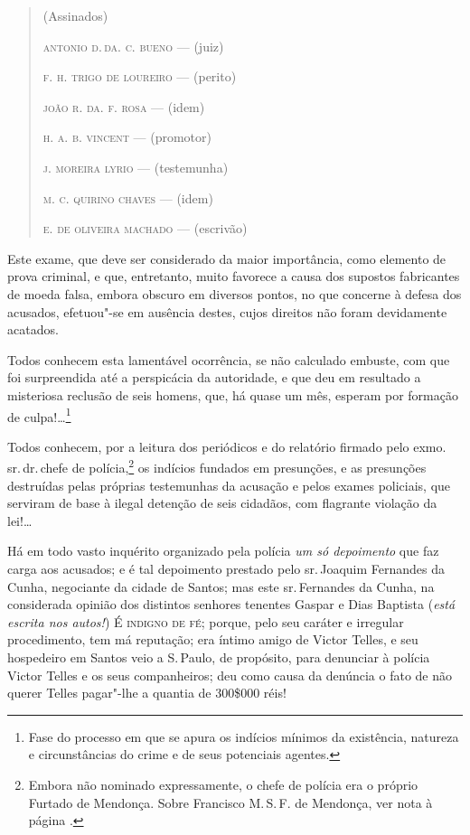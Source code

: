 \begin{quote}
\hfill(Assinados)

\hfill\textsc{antonio d.\,da. c. bueno} --- (juiz)

\hfill\textsc{f. h. trigo de loureiro} --- (perito)

\hfill\textsc{joão r. da. f. rosa} --- (idem)

\hfill\textsc{h. a. b. vincent} --- (promotor)

\hfill\textsc{j. moreira lyrio} --- (testemunha)

\hfill\textsc{m. c. quirino chaves} --- (idem)

\hfill\textsc{e. de oliveira machado} --- (escrivão)
\end{quote}

\asterisc

Este exame, que deve ser considerado da maior importância, como elemento
de prova criminal, e que, entretanto, muito favorece a causa dos
supostos fabricantes de moeda falsa, embora obscuro em diversos pontos,
no que concerne à defesa dos acusados, efetuou"-se em ausência destes,
cujos direitos não foram devidamente acatados.

Todos conhecem esta lamentável ocorrência, se não calculado embuste, com
que foi surpreendida até a perspicácia da autoridade, e que deu em
resultado a misteriosa reclusão de seis homens, que, há quase um mês,
esperam por formação de culpa!\ldots{}\footnote{Fase do processo em que se
  apura os indícios mínimos da existência, natureza e circunstâncias do
  crime e de seus potenciais agentes.}

Todos conhecem, por a leitura dos periódicos e do relatório firmado pelo
exmo.\,sr.\,dr.\,chefe de polícia,\footnote{Embora não nominado
  expressamente, o chefe de polícia era o próprio Furtado de Mendonça.
  Sobre Francisco M.\,S.\,F. de Mendonça, ver nota à página \pageref{fmfm}.} os
indícios fundados em presunções, e as presunções destruídas pelas
próprias testemunhas da acusação e pelos exames policiais, que serviram
de base à ilegal detenção de seis cidadãos, com flagrante violação da
lei!\ldots{}

Há em todo vasto inquérito organizado pela polícia \emph{um só
depoimento} que faz carga aos acusados; e é tal depoimento prestado pelo
sr.\,Joaquim Fernandes da Cunha, negociante da cidade de Santos; mas este
sr.\,Fernandes da Cunha, na considerada opinião dos distintos senhores
tenentes Gaspar e Dias Baptista (\emph{está escrita nos autos!}) É
\textsc{indigno de fé}; porque, pelo seu caráter e irregular procedimento, tem má
reputação; era íntimo amigo de Victor Telles, e seu hospedeiro em Santos
veio a S.\,Paulo, de propósito, para denunciar à polícia Victor Telles e
os seus companheiros; deu como causa da denúncia o fato de não querer
Telles pagar"-lhe a quantia de 300\$000 réis!

